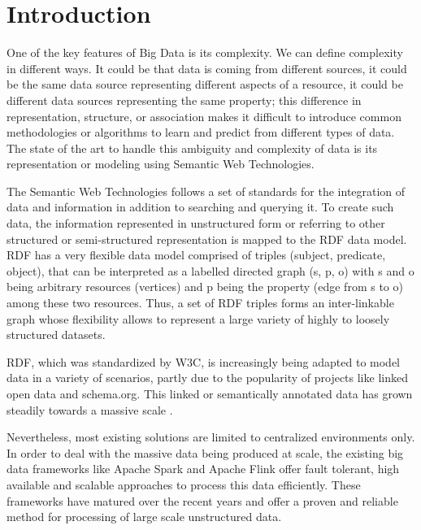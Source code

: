 \chapter{Introduction}
\label{chapter:intro}
One of the key features of Big Data is its complexity. 
We can define complexity in different ways.
It could be that data is coming from different sources, it could be the same data source representing different aspects of a resource, it could be different data sources representing the same property; this difference in representation, structure, or association makes it difficult to introduce common methodologies or algorithms to learn and predict from different types of data. 
The state of the art to handle this ambiguity and complexity of data is its representation or modeling using Semantic Web Technologies.

The Semantic Web Technologies follows a set of standards for the integration of data and information in addition to searching and querying it. 
To create such data, the information represented in unstructured form or referring to other structured or semi-structured representation is mapped to the \gls{RDF} data model. 
\gls{RDF} has a very flexible data model comprised of triples (subject, predicate, object), that can be interpreted as a labelled directed graph (s, p, o) with s and o being arbitrary resources (vertices) and p being the property (edge from s to o) among these two resources. 
Thus, a set of \gls{RDF} triples forms an inter-linkable graph whose flexibility allows to represent a large variety of highly to loosely structured datasets. 

RDF, which was standardized by \gls{W3C}, is increasingly being adapted to model data in a variety of scenarios, partly due to the popularity of projects like linked open data and schema.org. 
This linked or semantically annotated data has grown steadily towards a massive scale .

Nevertheless, most existing solutions are limited to centralized environments only.
In order to deal with the massive data being produced at scale, the existing big data frameworks like Apache Spark and Apache Flink offer fault tolerant, high available and scalable approaches to process this data efficiently. 
These frameworks have matured over the recent years and offer a proven and reliable method for processing of large scale unstructured data.

